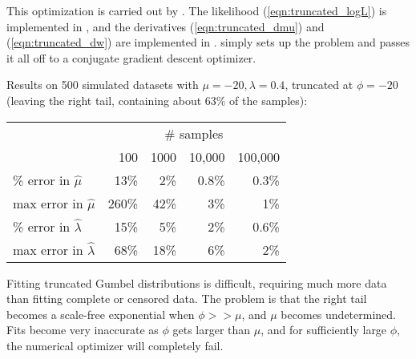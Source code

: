 This optimization is carried out by .
The likelihood (\ref{eqn:truncated_logL}) is implemented in
, and the derivatives (\ref{eqn:truncated_dmu}) and
(\ref{eqn:truncated_dw}) are implemented in .
 simply sets up the problem and passes
it all off to a conjugate gradient descent optimizer.

Results on 500 simulated datasets with $\mu = -20, \lambda = 0.4$,
truncated at $\phi = -20$ (leaving the right tail, containing about
63\% of the samples):

\begin{center}
\begin{tabular}{lrrrr} \hline
                              & \multicolumn{4}{c}{\# samples}\\
                              & 100 & 1000  & 10,000 & 100,000 \\
\% error in $\hat{\mu}$       & 13\%&   2\% &  0.8\% &  0.3\%  \\
max error in $\hat{\mu}$      &260\%&  42\% &    3\% &    1\%  \\
\% error in $\hat{\lambda}$   & 15\%&   5\% &    2\% &  0.6\%  \\
max error in $\hat{\lambda}$  & 68\%&  18\% &    6\% &    2\%  \\ \hline
\end{tabular}
\end{center}

Fitting truncated Gumbel distributions is difficult, requiring much
more data than fitting complete or censored data. The problem is that
the right tail becomes a scale-free exponential when $\phi >> \mu$,
and $\mu$ becomes undetermined. Fits become very inaccurate as $\phi$
gets larger than $\mu$, and for sufficiently large $\phi$, the
numerical optimizer will completely fail.







